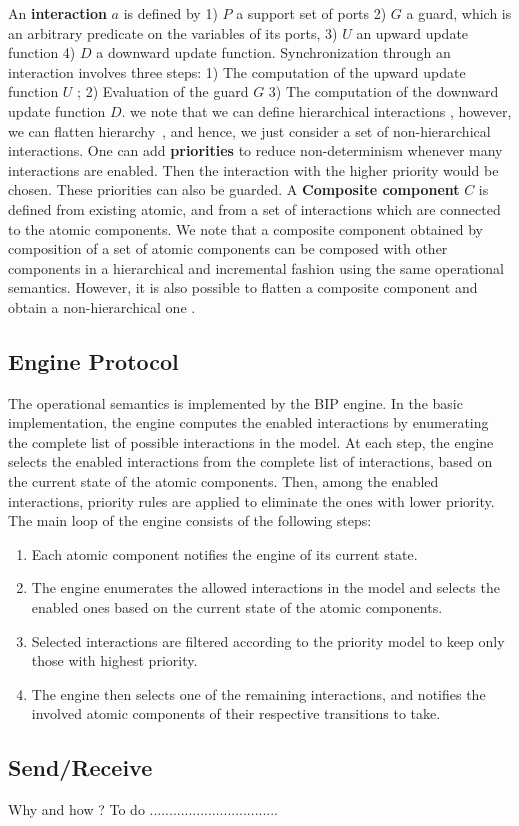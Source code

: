 An \textbf{interaction} $a$ is defined by 1) $P$ a support set of ports 2) $G$ a guard, which is an arbitrary predicate on the variables of its ports, 3) $U$ an upward update function 4) $D$ a downward update function.\newline
Synchronization through an interaction involves three steps: 1) The computation of the upward update function $U$ ; 2) Evaluation of the guard $G$ 3) The computation of the downward update function $D$. we note that we can define hierarchical interactions \cite{verif:bs08,verif:bs09}, however, we can flatten hierarchy~\cite{verif:bjs09}, and hence, we just consider a set of non-hierarchical interactions. \newline
One can add \textbf{priorities} to reduce non-determinism whenever many interactions are enabled. Then the interaction with the higher priority would be chosen. These priorities can also be guarded.\newline
A \textbf{Composite component} $C$ is defined from existing atomic, and from a set of interactions which are connected to the atomic components. We note that a composite component obtained by composition of a set of atomic components can be composed with other components in a hierarchical and incremental fashion using the same operational semantics. However, it is also possible to flatten a composite component and obtain a non-hierarchical one \cite{verif:bjs09}.





\subsection{Engine Protocol}  \label{sec:enumprotocol}
The operational semantics is implemented by the BIP engine. In the basic implementation, 
the engine computes the enabled interactions by enumerating the complete list of possible 
interactions in the model. At each step, the engine selects the enabled interactions from 
the complete list of interactions, based on the current state of the atomic components. 
Then, among the enabled interactions, priority rules are applied to eliminate the ones with 
lower priority.\\
The main loop of the engine consists of the following steps:
\begin{enumerate}
\item Each atomic component notifies the engine of its current state.
\item The engine enumerates the allowed interactions in the model and selects the enabled ones based on the current state of the atomic components.
\item Selected interactions are filtered according to the priority model to keep only those with highest priority.
\item The engine then selects one of the remaining interactions, and notifies the involved atomic components of their respective transitions to take.
\end{enumerate}

 
\subsection{Send/Receive}
Why and how ? To do .................................
